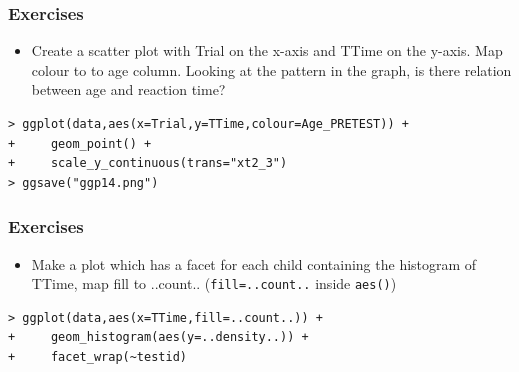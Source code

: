 \documentclass[xcolor={table},c]{beamer}
\begin{document}
\begin{frame}[fragile]\frametitle{Exercises}
  \begin{itemize}
  \item Create a scatter plot with Trial on the x-axis and TTime on the y-axis. Map colour to to age column. Looking at the pattern in the graph, is there relation between age and reaction time?
  \end{itemize}
\begin{verbatim}
> ggplot(data,aes(x=Trial,y=TTime,colour=Age_PRETEST)) +
+     geom_point() +
+     scale_y_continuous(trans="xt2_3") 
> ggsave("ggp14.png")
\end{verbatim}
\begin{center}
\end{center}
\end{frame}


\begin{frame}[fragile]\frametitle{Exercises}
  \begin{itemize}
  \item Make a plot which has a facet for each child containing the histogram of TTime, map fill to ..count.. (\texttt{fill=..count..} inside  \texttt{aes()}) 
  \end{itemize}
\begin{verbatim}
> ggplot(data,aes(x=TTime,fill=..count..)) +
+     geom_histogram(aes(y=..density..)) +
+     facet_wrap(~testid) 
\end{verbatim}
\begin{center}
\end{center}
\end{frame}
\end{document}
